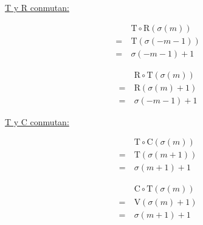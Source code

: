		 \underline{T y R conmutan:}
		 \vspace*{-2\bigskipamount}
		\begin{multicols}{2}
			\begin{align*}
			&\ \text{T}\circ\text{R}(\sigma(m))\\
			=&\ \text{T}(\sigma(-m-1))\\
			=&\ \sigma(-m-1)+1
			\end{align*}
			
			\begin{align*}
			&\ \text{R}\circ\text{T}(\sigma(m))\\
			=&\ \text{R}(\sigma(m)+1)\\
			=&\ \sigma(-m-1)+1
			\end{align*}
		\end{multicols}
	
		 \underline{T y C conmutan:}
		 \vspace*{-2\bigskipamount}
		\begin{multicols}{2}
			\begin{align*}
			&\ \text{T}\circ\text{C}(\sigma(m))\\
			=&\ \text{T}(\sigma(m+1))\\
			=&\ \sigma(m+1)+1
			\end{align*}
			
			\begin{align*}
			&\ \text{C}\circ\text{T}(\sigma(m))\\
			=&\ \text{V}(\sigma(m)+1)\\
			=&\ \sigma(m+1)+1
			\end{align*}
		\end{multicols}